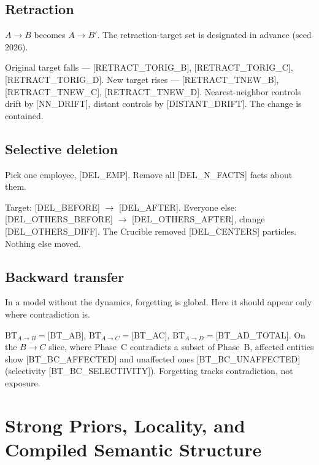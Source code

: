 \documentclass[11pt,twocolumn]{article}
\newcommand{\PH}[1]{[\textsc{#1}]}
\theoremstyle{plain}
\begin{document}
\subsection{Retraction}

$A \to B$ becomes $A \to B'$. The retraction-target set is designated in advance (seed $2026$).

Original target falls --- \PH{RETRACT\_TORIG\_B}, \PH{RETRACT\_TORIG\_C}, \PH{RETRACT\_TORIG\_D}. New target rises --- \PH{RETRACT\_TNEW\_B}, \PH{RETRACT\_TNEW\_C}, \PH{RETRACT\_TNEW\_D}. Nearest-neighbor controls drift by \PH{NN\_DRIFT}, distant controls by \PH{DISTANT\_DRIFT}. The change is contained.

\subsection{Selective deletion}

Pick one employee, \PH{DEL\_EMP}. Remove all \PH{DEL\_N\_FACTS} facts about them.

Target: \PH{DEL\_BEFORE} $\to$ \PH{DEL\_AFTER}. Everyone else: \PH{DEL\_OTHERS\_BEFORE} $\to$ \PH{DEL\_OTHERS\_AFTER}, change \PH{DEL\_OTHERS\_DIFF}. The Crucible removed \PH{DEL\_CENTERS} particles. Nothing else moved.

\subsection{Backward transfer}

In a model without the dynamics, forgetting is global. Here it should appear only where contradiction is.

$\mathrm{BT}_{A \to B}{=}$\PH{BT\_AB}, $\mathrm{BT}_{A \to C}{=}$\PH{BT\_AC}, $\mathrm{BT}_{A \to D}{=}$\PH{BT\_AD\_TOTAL}. On the $B \to C$ slice, where Phase~C contradicts a subset of Phase~B, affected entities show \PH{BT\_BC\_AFFECTED} and unaffected ones \PH{BT\_BC\_UNAFFECTED} (selectivity \PH{BT\_BC\_SELECTIVITY}). Forgetting tracks contradiction, not exposure.

\section{Strong Priors, Locality, and Compiled Semantic Structure}
\label{sec:scope}
\end{document}
